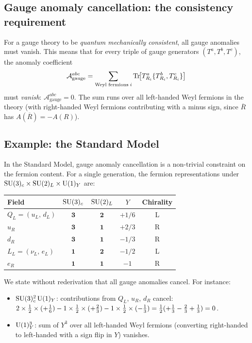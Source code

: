 \documentclass[11pt,a4paper]{article}
\begin{document}
\subsection{Gauge anomaly cancellation: the consistency requirement}

For a gauge theory to be \emph{quantum mechanically consistent}, all gauge
anomalies must vanish.  This means that for every triple of gauge
generators $(T^a, T^b, T^c)$, the anomaly coefficient
\begin{equation}
  \mathcal{A}^{abc}_{\text{gauge}}
  = \sum_{\text{Weyl fermions}\; i}
    \mathrm{Tr}\!\bigl[T^a_{R_i}\{T^b_{R_i}, T^c_{R_i}\}\bigr]
  \label{eq:gauge-anomaly}
\end{equation}
must \emph{vanish}: $\mathcal{A}^{abc}_{\text{gauge}} = 0$.  The sum runs
over all left-handed Weyl fermions in the theory (with right-handed Weyl
fermions contributing with a minus sign, since $\overline{R}$ has
$A(\overline{R}) = -A(R)$).

\subsection{Example: the Standard Model}

In the Standard Model, gauge anomaly cancellation is a non-trivial constraint
on the fermion content.  For a single generation, the fermion representations
under $\mathrm{SU}(3)_c \times \mathrm{SU}(2)_L \times \mathrm{U}(1)_Y$ are:
\begin{center}
\renewcommand{\arraystretch}{1.3}
\begin{tabular}{@{}l c c c c@{}}
\toprule
\textbf{Field} & $\mathrm{SU}(3)_c$ & $\mathrm{SU}(2)_L$ & $Y$ & Chirality \\
\midrule
$Q_L = (u_L,\, d_L)$ & $\mathbf{3}$ & $\mathbf{2}$ & $+1/6$ & L \\
$u_R$ & $\mathbf{3}$ & $\mathbf{1}$ & $+2/3$ & R \\
$d_R$ & $\mathbf{3}$ & $\mathbf{1}$ & $-1/3$ & R \\
$L_L = (\nu_L,\, e_L)$ & $\mathbf{1}$ & $\mathbf{2}$ & $-1/2$ & L \\
$e_R$ & $\mathbf{1}$ & $\mathbf{1}$ & $-1$ & R \\
\bottomrule
\end{tabular}
\end{center}

We state without rederivation that all gauge anomalies cancel.
For instance:
\begin{itemize}
  \item $\mathrm{SU}(3)_c^2 \,\mathrm{U}(1)_Y$: contributions from $Q_L$, $u_R$, $d_R$
    cancel:
    $2 \times \tfrac{1}{2} \times (+\tfrac{1}{6})
     - 1 \times \tfrac{1}{2} \times (+\tfrac{2}{3})
     - 1 \times \tfrac{1}{2} \times (-\tfrac{1}{3})
     = \tfrac{1}{2}(+\tfrac{1}{3} - \tfrac{2}{3} + \tfrac{1}{3}) = 0$.
  \item $\mathrm{U}(1)_Y^3$: sum of $Y^3$ over all left-handed Weyl fermions
    (converting right-handed to left-handed with a sign flip in $Y$)
    vanishes.
\end{itemize}
\end{document}
